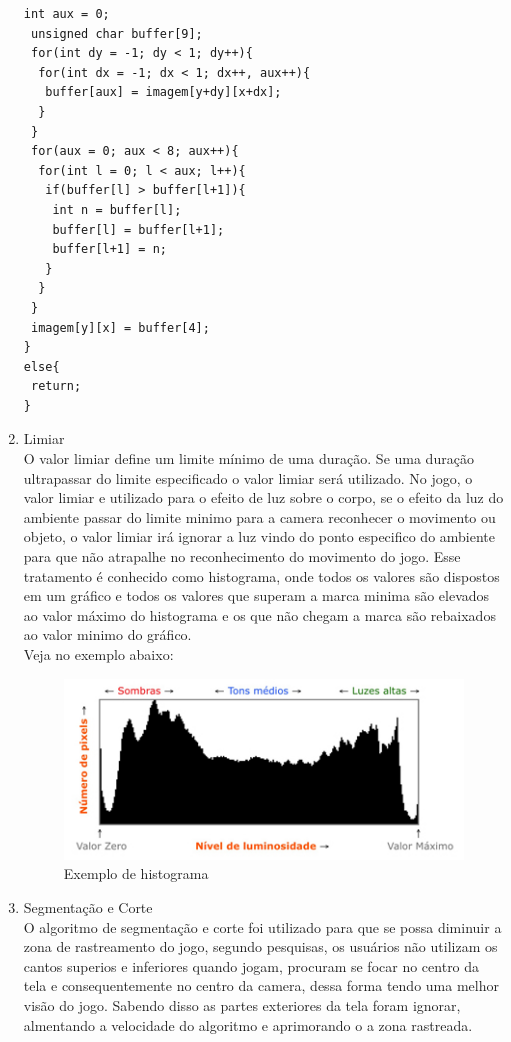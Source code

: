 \documentclass[a4paper]{article}
\begin{document}
\begin{enumerate}
\begin{lstlisting}
int aux = 0;
 unsigned char buffer[9];
 for(int dy = -1; dy < 1; dy++){
  for(int dx = -1; dx < 1; dx++, aux++){
   buffer[aux] = imagem[y+dy][x+dx];
  }
 }
 for(aux = 0; aux < 8; aux++){
  for(int l = 0; l < aux; l++){
   if(buffer[l] > buffer[l+1]){
    int n = buffer[l];
    buffer[l] = buffer[l+1];
    buffer[l+1] = n;
   }
  }
 }
 imagem[y][x] = buffer[4];
}
else{
 return;
}
\end{lstlisting}

\item{Limiar}
\\

O valor limiar define um limite mínimo de uma duração. Se uma duração ultrapassar do limite especificado o valor limiar será utilizado.
No jogo, o valor limiar e utilizado para o efeito de luz sobre o corpo, se o efeito da luz do ambiente passar do limite minimo para a camera reconhecer o movimento ou objeto, o valor limiar irá ignorar a luz vindo do ponto especifico do ambiente para que não atrapalhe no reconhecimento do movimento do jogo.
Esse tratamento é conhecido como histograma, onde todos os valores são dispostos em um gráfico e todos os valores que superam a marca minima são elevados ao valor máximo do histograma e os que não chegam a marca são rebaixados ao valor minimo do gráfico. 
\\
Veja no exemplo abaixo:

\begin{figure}
\centering
\includegraphics{histograma2.jpg}
\caption{Exemplo de histograma}
\end{figure}

\item{Segmentação e Corte}
\\
O algoritmo de segmentação e corte foi utilizado para que se possa diminuir a zona de rastreamento do jogo, segundo pesquisas, os usuários não utilizam os cantos superios e inferiores quando jogam, procuram se focar no centro da tela e consequentemente no centro da camera, dessa forma tendo uma melhor visão do jogo. Sabendo disso as partes exteriores da tela foram ignorar, almentando a velocidade do algoritmo e aprimorando o a zona rastreada.


\end{enumerate}
\end{document}
